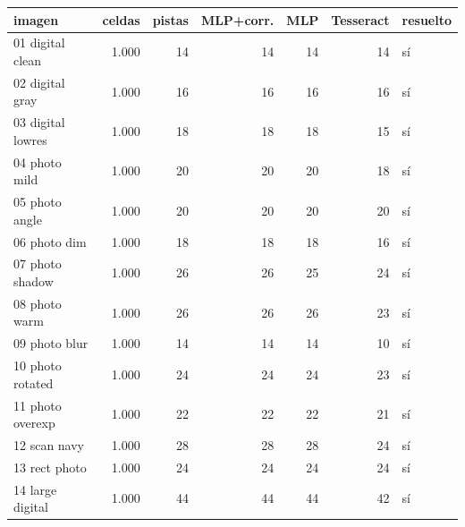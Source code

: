 \begin{tabular}{lrrrrrl}
\toprule
imagen & celdas & pistas & MLP+corr. & MLP & Tesseract & resuelto \\
\midrule
01 digital clean & 1.000 & 14 & 14 & 14 & 14 & sí \\
02 digital gray & 1.000 & 16 & 16 & 16 & 16 & sí \\
03 digital lowres & 1.000 & 18 & 18 & 18 & 15 & sí \\
04 photo mild & 1.000 & 20 & 20 & 20 & 18 & sí \\
05 photo angle & 1.000 & 20 & 20 & 20 & 20 & sí \\
06 photo dim & 1.000 & 18 & 18 & 18 & 16 & sí \\
07 photo shadow & 1.000 & 26 & 26 & 25 & 24 & sí \\
08 photo warm & 1.000 & 26 & 26 & 26 & 23 & sí \\
09 photo blur & 1.000 & 14 & 14 & 14 & 10 & sí \\
10 photo rotated & 1.000 & 24 & 24 & 24 & 23 & sí \\
11 photo overexp & 1.000 & 22 & 22 & 22 & 21 & sí \\
12 scan navy & 1.000 & 28 & 28 & 28 & 24 & sí \\
13 rect photo & 1.000 & 24 & 24 & 24 & 24 & sí \\
14 large digital & 1.000 & 44 & 44 & 44 & 42 & sí \\
\bottomrule
\end{tabular}
